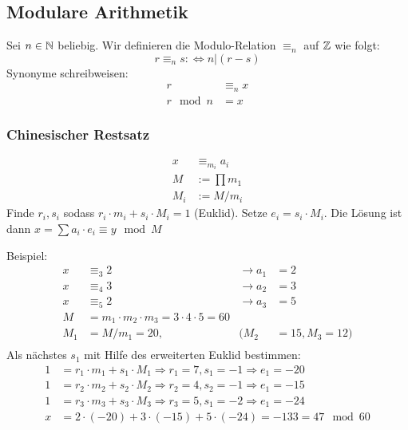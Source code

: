 \subsection{Modulare Arithmetik}
Sei $n \in \mathbb{N}$ beliebig. Wir definieren die Modulo-Relation $\equiv_n$ auf $\mathbb{Z}$ wie folgt:
\begin{equation*}
 r \equiv_n s :\Leftrightarrow n | (r - s)
\end{equation*}
Synonyme schreibweisen:
\begin{align*}
 r &\equiv_n x \\
 r \mod n& = x
\end{align*}

\subsubsection{Chinesischer Restsatz}
\begin{align*}
  x& \equiv_{m_i} a_i\\
  M& := \prod m_1\\
  M_i & := M / m_i
\end{align*}
Finde $r_i, s_i$ sodass $r_i \cdot m_i + s_i \cdot M_i = 1$ (Euklid). Setze $e_i = s_i \cdot M_i$. Die Lösung ist dann $x = \sum a_i \cdot e_i \equiv y \mod M$

Beispiel:
\begin{align*}
 x &\equiv_3 2& \to a_1& = 2\\
 x &\equiv_4 3& \to a_2& = 3\\
 x &\equiv_5 2& \to a_3& = 5\\
 M &= m_1 \cdot m_2 \cdot m_3 = 3 \cdot 4 \cdot 5 = 60\\
 M_1 & = M / m_1 = 20, & (M_2& = 15, M_3 = 12)\\
\end{align*}
Als nächstes $s_1$ mit Hilfe des erweiterten Euklid bestimmen:
\begin{align*}
 1 &= r_1 \cdot m_1 + s_1 \cdot M_1  \Rightarrow r_1 = 7, s_1 = -1 \Rightarrow e_1 = -20\\
 1 &= r_2 \cdot m_2 + s_2 \cdot M_2  \Rightarrow r_2 = 4, s_2 = -1 \Rightarrow e_1 = -15\\
 1 &= r_3 \cdot m_3 + s_3 \cdot M_3  \Rightarrow r_3 = 5, s_1 = -2 \Rightarrow e_1 = -24\\
 x &= 2 \cdot (-20) + 3 \cdot (-15) + 5 \cdot (-24) = - 133 = 47 \mod 60\\
\end{align*}
